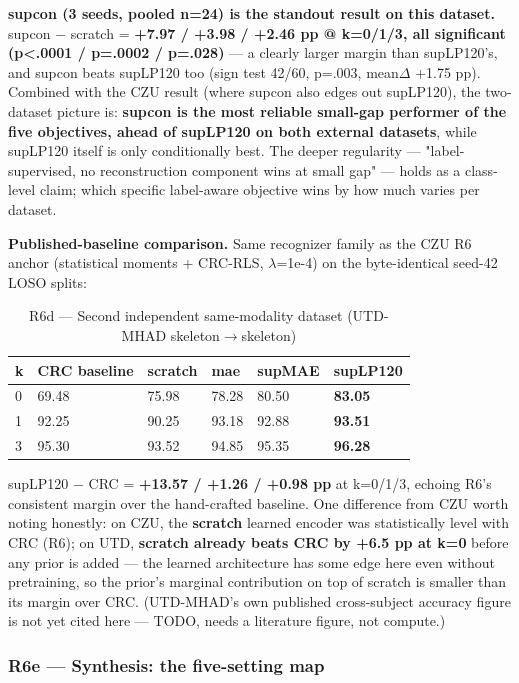 \textbf{supcon (3 seeds, pooled n=24) is the standout result on this dataset.} supcon $-$ scratch = \textbf{+7.97 / +3.98 / +2.46 pp @ k=0/1/3, all significant (p<.0001 / p=.0002 / p=.028)} --- a clearly larger margin than supLP120's, and supcon beats supLP120 too (sign test 42/60, p=.003, mean$\Delta$ +1.75 pp). Combined with the CZU result (where supcon also edges out supLP120), the two-dataset picture is: \textbf{supcon is the most reliable small-gap performer of the five objectives, ahead of supLP120 on both external datasets}, while supLP120 itself is only conditionally best. The deeper regularity --- "label-supervised, no reconstruction component wins at small gap" --- holds as a class-level claim; which specific label-aware objective wins by how much varies per dataset.

\textbf{Published-baseline comparison.} Same recognizer family as the CZU R6 anchor (statistical moments + CRC-RLS, $\lambda$=1e-4) on the byte-identical seed-42 LOSO splits:

\begin{table}[!t]
\centering
\caption{R6d --- Second independent same-modality dataset (UTD-MHAD skeleton$\rightarrow$skeleton)}
\small
\begin{tabular}{llllll}
\toprule
k & CRC baseline & scratch & mae & supMAE & supLP120 \\
\midrule
0 & 69.48 & 75.98 & 78.28 & 80.50 & \textbf{83.05} \\
1 & 92.25 & 90.25 & 93.18 & 92.88 & \textbf{93.51} \\
3 & 95.30 & 93.52 & 94.85 & 95.35 & \textbf{96.28} \\
\bottomrule
\end{tabular}
\end{table}

supLP120 $-$ CRC = \textbf{+13.57 / +1.26 / +0.98 pp} at k=0/1/3, echoing R6's consistent margin over the hand-crafted baseline. One difference from CZU worth noting honestly: on CZU, the \textbf{scratch} learned encoder was statistically level with CRC (R6); on UTD, \textbf{scratch already beats CRC by +6.5 pp at k=0} before any prior is added --- the learned architecture has some edge here even without pretraining, so the prior's marginal contribution on top of scratch is smaller than its margin over CRC. (UTD-MHAD's own published cross-subject accuracy figure is not yet cited here --- TODO, needs a literature figure, not compute.)

\subsubsection{R6e --- Synthesis: the five-setting map}

